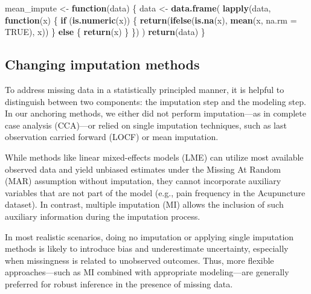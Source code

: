 \documentclass{article}
\newenvironment{Shaded}{\begin{snugshade}}{\end{snugshade}}
\newcommand{\AttributeTok}[1]{\textcolor[rgb]{0.13,0.29,0.53}{#1}}
\newcommand{\ConstantTok}[1]{\textcolor[rgb]{0.56,0.35,0.01}{#1}}
\newcommand{\ControlFlowTok}[1]{\textcolor[rgb]{0.13,0.29,0.53}{\textbf{#1}}}
\newcommand{\FunctionTok}[1]{\textcolor[rgb]{0.13,0.29,0.53}{\textbf{#1}}}
\newcommand{\NormalTok}[1]{#1}
\newcommand{\OtherTok}[1]{\textcolor[rgb]{0.56,0.35,0.01}{#1}}
\begin{document}
\begin{Shaded}
\begin{Highlighting}[]
\NormalTok{mean\_impute }\OtherTok{\textless{}{-}} \ControlFlowTok{function}\NormalTok{(data) \{}
\NormalTok{  data }\OtherTok{\textless{}{-}} \FunctionTok{data.frame}\NormalTok{(}
    \FunctionTok{lapply}\NormalTok{(data, }\ControlFlowTok{function}\NormalTok{(x) \{}
      \ControlFlowTok{if}\NormalTok{ (}\FunctionTok{is.numeric}\NormalTok{(x)) \{}
        \FunctionTok{return}\NormalTok{(}\FunctionTok{ifelse}\NormalTok{(}\FunctionTok{is.na}\NormalTok{(x), }\FunctionTok{mean}\NormalTok{(x, }\AttributeTok{na.rm =} \ConstantTok{TRUE}\NormalTok{), x))}
\NormalTok{      \} }\ControlFlowTok{else}\NormalTok{ \{}
        \FunctionTok{return}\NormalTok{(x)}
\NormalTok{      \}}
\NormalTok{    \})}
\NormalTok{  )}
  \FunctionTok{return}\NormalTok{(data)}
\NormalTok{\}}
\end{Highlighting}
\end{Shaded}

\subsection{Changing imputation
methods}\label{changing-imputation-methods}

To address missing data in a statistically principled manner, it is
helpful to distinguish between two components: the imputation step and
the modeling step. In our anchoring methods, we either did not perform
imputation---as in complete case analysis (CCA)---or relied on single
imputation techniques, such as last observation carried forward (LOCF)
or mean imputation.

While methods like linear mixed-effects models (LME) can utilize most
available observed data and yield unbiased estimates under the Missing
At Random (MAR) assumption without imputation, they cannot incorporate
auxiliary variables that are not part of the model (e.g., pain frequency
in the Acupuncture dataset). In contrast, multiple imputation (MI)
allows the inclusion of such auxiliary information during the imputation
process.

In most realistic scenarios, doing no imputation or applying single
imputation methods is likely to introduce bias and underestimate
uncertainty, especially when missingness is related to unobserved
outcomes. Thus, more flexible approaches---such as MI combined with
appropriate modeling---are generally preferred for robust inference in
the presence of missing data.
\end{document}
